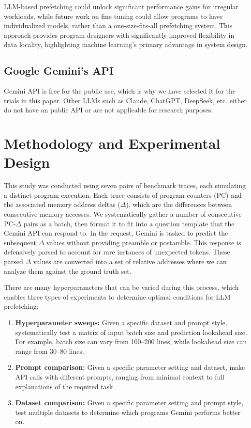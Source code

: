 \documentclass[sigconf,authorversion,nonacm]{acmart}
\begin{document}
LLM-based prefetching could unlock significant performance gains for irregular workloads, while future work on fine tuning could allow programs to have individualized models, rather than a one-size-fits-all prefetching system. This approach provides program designers with significantly improved flexibility in data locality, highlighting machine learning's primary advantage in system design.

\subsection{Google Gemini's API}
Gemini API is free for the public use, which is why we have selected it for the trials in this paper. Other LLMs such as Claude, ChatGPT, DeepSeek, etc. either do not have an public API or are not applicable for research purposes. 


\newpage
\section{Methodology and Experimental Design}
\label{sec:design}

This study was conducted using seven pairs of benchmark traces, each simulating a distinct program execution. Each trace consists of program counters (PC) and the associated memory address deltas ($\Delta$), which are the differences between consecutive memory accesses. We systematically gather a number of consecutive PC-$\Delta$ pairs as a batch, then format it to fit into a question template that the Gemini API can respond to. In the request, Gemini is tasked to predict the subsequent $\Delta$ values without providing preamble or postamble. This response is defensively parsed to account for rare instances of unexpected tokens. These parsed $\Delta$ values are converted into a set of relative addresses where we can analyze them against the ground truth set.

There are many hyperparameters that can be varied during this process, which enables three types of experiments to determine optimal conditions for LLM prefetching:

\begin{enumerate}
    \item \textbf{Hyperparameter sweeps:} Given a specific dataset and prompt style, systematically test a matrix of input batch size and prediction lookahead size. For example, batch size can vary from 100--200 lines, while lookahead size can range from 30--80 lines.
    
    \item \textbf{Prompt comparison:} Given a specific parameter setting and dataset, make API calls with different prompts, ranging from minimal context to full explanations of the required task.
    
    \item \textbf{Dataset comparison:} Given a specific parameter setting and prompt style, test multiple datasets to determine which programs Gemini performs better on.
\end{enumerate}
\end{document}
